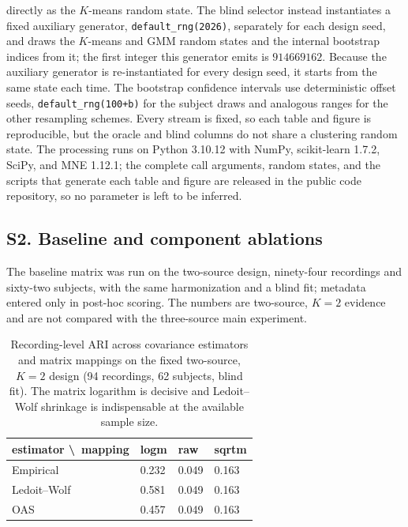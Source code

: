 \begin{enumerate}
  directly as the \(K\)-means random state. The blind selector instead
  instantiates a fixed auxiliary generator, \texttt{default\_rng(2026)},
  separately for each design seed, and draws the \(K\)-means and GMM
  random states and the internal bootstrap indices from it; the first
  integer this generator emits is \(914669162\). Because the auxiliary
  generator is re-instantiated for every design seed, it starts from the
  same state each time. The bootstrap confidence intervals use
  deterministic offset seeds, \texttt{default\_rng(100+b)} for the
  subject draws and analogous ranges for the other resampling schemes.
  Every stream is fixed, so each table and figure is reproducible, but
  the oracle and blind columns do not share a clustering random state.
  The processing runs on Python 3.10.12 with NumPy, scikit-learn 1.7.2,
  SciPy, and MNE 1.12.1; the complete call arguments, random states, and
  the scripts that generate each table and figure are released in the
  public code repository, so no parameter is left to be inferred.
\end{enumerate}

\subsection{S2. Baseline and component
ablations}\label{s2.-baseline-and-component-ablations}

The baseline matrix was run on the two-source design, ninety-four
recordings and sixty-two subjects, with the same harmonization and a
blind fit; metadata entered only in post-hoc scoring. The numbers are
two-source, \(K=2\) evidence and are not compared with the three-source
main experiment.

\begin{table}[H]
\centering
\small
\caption{Recording-level ARI across covariance estimators and matrix mappings on the fixed two-source, $K=2$ design (94 recordings, 62 subjects, blind fit). The matrix logarithm is decisive and Ledoit--Wolf shrinkage is indispensable at the available sample size.}
\label{tab:covrep}
\begin{tabular}{llll}
\hline
estimator \textbackslash\ mapping & logm & raw & sqrtm\\
\hline
Empirical & 0.232 & 0.049 & 0.163\\
Ledoit–Wolf & 0.581 & 0.049 & 0.163\\
OAS & 0.457 & 0.049 & 0.163\\
\hline
\end{tabular}

\end{table}

